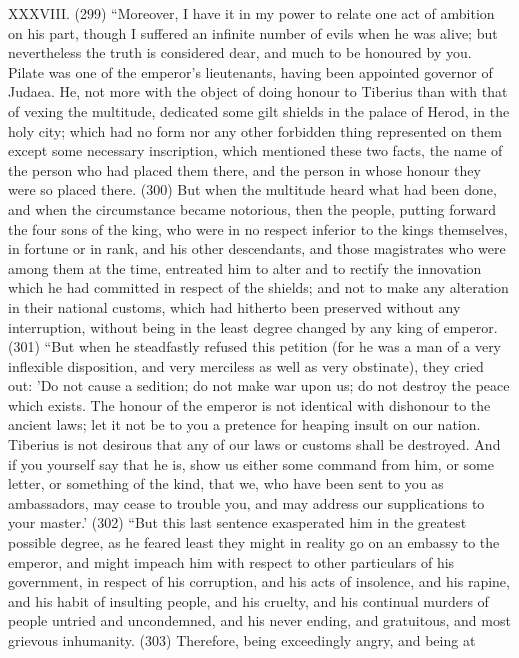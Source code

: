 XXXVIII. (299) ``Moreover, I have it in my power to relate one act of ambition on his part, though I
suffered an infinite number of evils when he was alive; but nevertheless the truth is considered
dear, and much to be honoured by you. Pilate was one of the emperor's lieutenants, having been
appointed governor of Judaea. He, not more with the object of doing honour to Tiberius than with
that of vexing the multitude, dedicated some gilt shields in the palace of Herod, in the holy city;
which had no form nor any other forbidden thing represented on them except some necessary
inscription, which mentioned these two facts, the name of the person who had placed them there,
and the person in whose honour they were so placed there. (300) But when the multitude heard
what had been done, and when the circumstance became notorious, then the people, putting
forward the four sons of the king, who were in no respect inferior to the kings themselves, in
fortune or in rank, and his other descendants, and those magistrates who were among them at the
time, entreated him to alter and to rectify the innovation which he had committed in respect of the
shields; and not to make any alteration in their national customs, which had hitherto been
preserved without any interruption, without being in the least degree changed by any king of
emperor. (301) ``But when he steadfastly refused this petition (for he was a man of a very inflexible
disposition, and very merciless as well as very obstinate), they cried out: 'Do not cause a sedition;
do not make war upon us; do not destroy the peace which exists. The honour of the emperor is not
identical with dishonour to the ancient laws; let it not be to you a pretence for heaping insult on our
nation. Tiberius is not desirous that any of our laws or customs shall be destroyed. And if you
yourself say that he is, show us either some command from him, or some letter, or something of
the kind, that we, who have been sent to you as ambassadors, may cease to trouble you, and may
address our supplications to your master.' (302) ``But this last sentence exasperated him in the
greatest possible degree, as he feared least they might in reality go on an embassy to the
emperor, and might impeach him with respect to other particulars of his government, in respect of
his corruption, and his acts of insolence, and his rapine, and his habit of insulting people, and his
cruelty, and his continual murders of people untried and uncondemned, and his never ending, and
gratuitous, and most grievous inhumanity. (303) Therefore, being exceedingly angry, and being at

